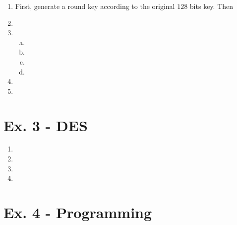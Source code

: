 \documentclass[11pt,a4paper]{article}
\begin{document}
\begin{enumerate}
	\item First, generate a round key according to the original $128$ bits key. Then
	
	\item
	
	\item
	\begin{enumerate}[(a)]
		\item
		
		\item
		
		\item
		
		\item
		
	\end{enumerate}
	
	\item
	
	\item
	 
\end{enumerate}

\section*{Ex. 3 - DES}
\begin{enumerate}
	\item
	
	\item
	
	\item
	
	\item
\end{enumerate}

\section*{Ex. 4 - Programming}
\end{document}
